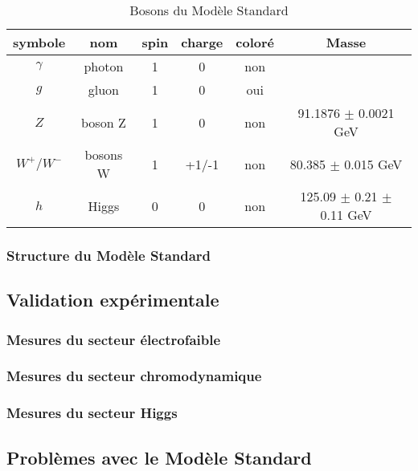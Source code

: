 \begin{table}[h!]
  \centering
  \begin{tabular}{|c|c|c|c|c|c|}
  \hline
  symbole   & nom      & spin & charge & coloré & Masse \\ \hline
  $\gamma$  & photon   & 1    & 0      & non    &     \\ \hline
  $g$       & gluon    & 1    & 0      & oui    &     \\ \hline
  $Z$       & boson Z  & 1    & 0      & non    & 91.1876 $\pm$ 0.0021 GeV \cite{olive_review_2014} \\ \hline
  $W^+/W^-$ & bosons W & 1    & +1/-1  & non    & 80.385 $\pm$ 0.015 GeV \cite{olive_review_2014} \\ \hline
  $h$       & Higgs    & 0    & 0      & non    & 125.09 $\pm$ 0.21 $\pm$ 0.11 GeV \cite{atlas_collaboration_combined_2015}     \\ \hline
\end{tabular}
\caption{Bosons du Modèle Standard}
\end{table}
\subsubsection{Structure du Modèle Standard}
\label{sec:ms:th:struct}

\subsection{Validation expérimentale}
\label{sec:ms:exp}

\subsubsection{Mesures du secteur électrofaible}
\label{sec:ms:exp:ewk}

\subsubsection{Mesures du secteur chromodynamique}
\label{sec:ms:exp:qcd}

\subsubsection{Mesures du secteur Higgs}
\label{sec:ms:exp:higgs}

\subsection{Problèmes avec le Modèle Standard}
\label{sec:ms:problemes}
